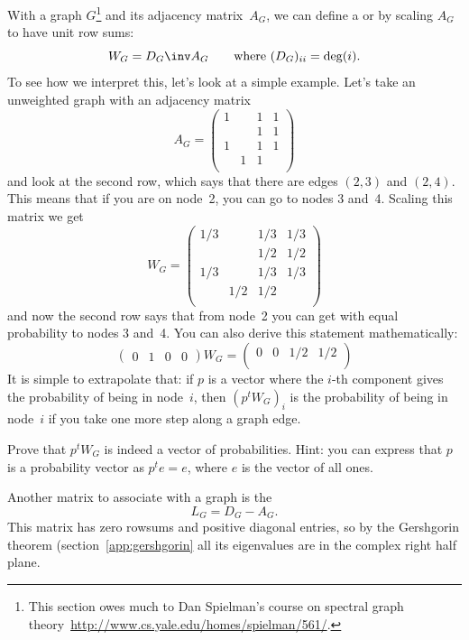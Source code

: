 With a graph $G$\footnote{This section owes much to Dan Spielman's course
on spectral graph theory~\url{http://www.cs.yale.edu/homes/spielman/561/}.}
and its adjacency matrix~$A_G$, we can define a
 or  by scaling
$A_G$ to have unit row sums:
\[ W_G = D_G\inv A_G\qquad \hbox{where $(D_G)_{ii}=\deg(i)$}. \]
To see how we interpret this, let's look at a simple example.
Let's take an unweighted graph with an adjacency matrix
\[
A_G = \begin{pmatrix}
1& &1&1\\
 & &1&1\\
1& &1&1\\
 &1&1& \\
\end{pmatrix}
\]
and look at the second row, which says that there are edges $(2,3)$ 
and $(2,4)$. This means that if you are on node~2, you can go 
to nodes 3 and~4. Scaling this matrix we get
\[
W_G = \begin{pmatrix}
1/3&   &1/3&1/3\\
   &   &1/2&1/2\\
1/3&   &1/3&1/3\\
   &1/2&1/2&   \\
\end{pmatrix}
\]
and now the second row says that from node~2 you can get
with equal probability to nodes 3 and~4.
You can also derive this statement mathematically:
\[
\begin{pmatrix}
0&1&0&0
\end{pmatrix} W_G =
\begin{pmatrix}
  0&  0&1/2&1/2\\
\end{pmatrix}
\]
It is simple to extrapolate that: if $p$ is a vector where the $i$-th
component gives the probability of being in node~$i$, then $(p^tW_G)_i$
is the probability of being in node~$i$ if you take one more
step along a graph edge.

\begin{exercise}
Prove that $p^tW_G$ is indeed a vector of probabilities. Hint: 
you can express that $p$ is a probability vector as $p^te=e$,
where $e$ is the vector of all ones.
\end{exercise}

Another matrix to associate with a graph is the
\[ L_G = D_G-A_G. \]
This matrix has zero rowsums and positive diagonal entries, so by the
Gershgorin theorem (section~\ref{app:gershgorin} all its eigenvalues
are in the complex right half plane. 


